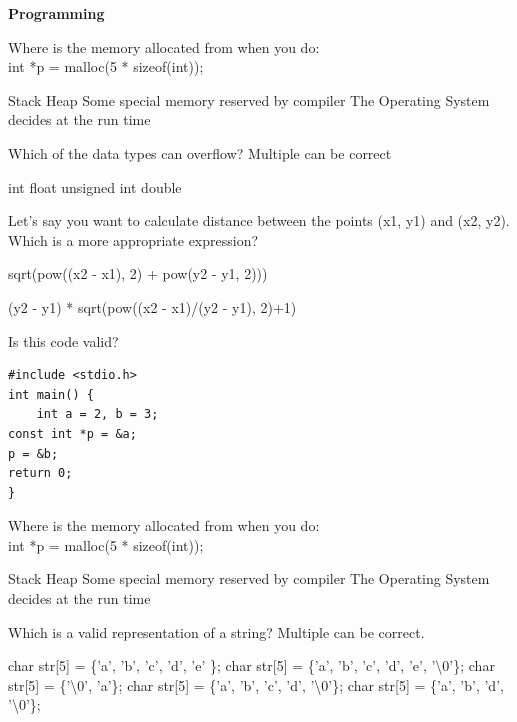 \documentclass[12pt]{exam}
\begin{document}
\centering \large \textbf{Programming}
\normalsize
\begin{questions}
\question[1]Where is the memory allocated from when you do:\\
int *p = malloc(5 * sizeof(int));
\begin{choices}	
\choice Stack
\choice Heap
\choice Some special memory reserved by compiler
\choice The Operating System decides at the run time
\end{choices}


\question[1] Which of the data types can overflow? Multiple can be correct
\begin{multicols}{2}
\begin{choices}	
\choice int
\choice float
\choice unsigned int
\choice double
\end{choices}
\end{multicols}

\question[1] Let’s say you want to calculate distance between the points (x1, y1) and (x2, y2). Which is a more appropriate expression?
\begin{choices}	
\choice  sqrt(pow((x2 - x1), 2) + pow(y2 - y1, 2)))

\choice  (y2 - y1) * sqrt(pow((x2 - x1)/(y2 - y1), 2)+1)

\end{choices}

\question[2]  Is this code valid?
\begin{lstlisting}
#include <stdio.h>
int main() {
	int a = 2, b = 3;
const int *p = &a;
p = &b;
return 0;
} 
\end{lstlisting}
\fbox{
	\begin{minipage}{1.5cm}
		\hfill\vspace{3mm}
	\end{minipage}
	}

\question[1]Where is the memory allocated from when you do:\\
int *p = malloc(5 * sizeof(int));
\begin{choices}	
\choice Stack
\choice Heap
\choice Some special memory reserved by compiler
\choice The Operating System decides at the run time
\end{choices}

\question[2]Which is a valid representation of a string? Multiple can be correct.
\begin{choices}	
\choice char str[5] = \{'a', 'b', 'c', 'd', 'e' \};
\choice char str[5] = \{'a', 'b', 'c', 'd', 'e', '\textbackslash 0'\};
\choice char str[5] = \{'\textbackslash0', 'a'\};
\choice char str[5] = \{'a', 'b', 'c', 'd', '\textbackslash 0'\};
\choice char str[5] = \{'a', 'b', 'd', '\textbackslash 0'\};
\end{choices}


\end{questions}
\end{document}
